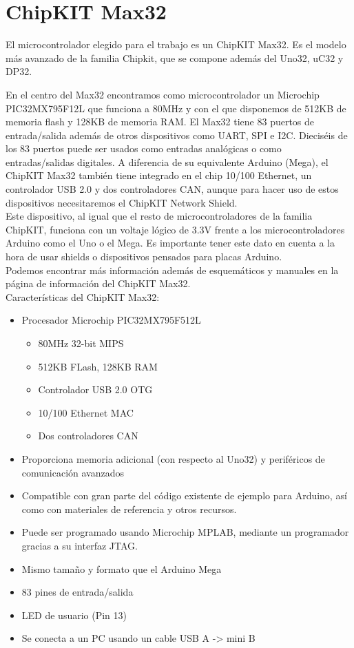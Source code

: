 \section{ChipKIT Max32}
El microcontrolador elegido para el trabajo es un ChipKIT Max32. Es el modelo más avanzado de la familia Chipkit, que se compone además del Uno32, uC32 y DP32.


En el centro del Max32 encontramos como microcontrolador un Microchip PIC32MX795F12L que funciona a 80MHz y con el que disponemos de 512KB de memoria flash y 128KB de memoria RAM. El Max32 tiene 83 puertos de entrada/salida además de otros dispositivos como UART, SPI e I2C. Dieciséis de los 83 puertos puede ser usados como entradas analógicas o como entradas/salidas digitales. A diferencia de su equivalente Arduino (Mega), el ChipKIT Max32 también tiene integrado en el chip 10/100 Ethernet, un controlador USB 2.0 y dos controladores CAN, aunque para hacer uso de estos dispositivos necesitaremos el ChipKIT Network Shield.\\

Este dispositivo, al igual que el resto de microcontroladores de la familia ChipKIT, funciona con un voltaje lógico de 3.3V frente a los microcontroladores Arduino como el Uno o el Mega. Es importante tener este dato en cuenta a la hora de usar shields o dispositivos pensados para placas Arduino.\\

Podemos encontrar más información además de esquemáticos y manuales en la página de información del ChipKIT Max32\cite{website:max32}.\\

Características del ChipKIT Max32:
\begin{itemize}
	\item Procesador Microchip PIC32MX795F512L
		\begin{itemize}
			\item 80MHz 32-bit MIPS
			\item 512KB FLash, 128KB RAM
			\item Controlador USB 2.0 OTG
			\item 10/100 Ethernet MAC
			\item Dos controladores CAN
		\end{itemize}
	\item Proporciona memoria adicional (con respecto al Uno32) y periféricos de comunicación avanzados
	\item Compatible con gran parte del código existente de ejemplo para Arduino, así como con materiales de referencia y otros recursos.
	\item Puede ser programado usando Microchip MPLAB, mediante un programador gracias a su interfaz JTAG.
	\item Mismo tamaño y formato que el Arduino Mega
	\item 83 pines de entrada/salida
	\item LED de usuario (Pin 13)
	\item Se conecta a un PC usando un cable USB A -> mini B
\end{itemize}


